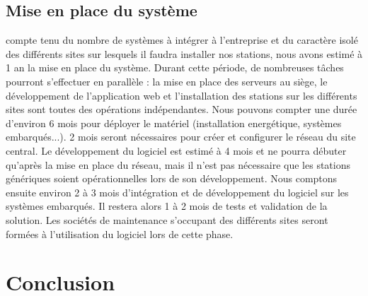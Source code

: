   \subsection{Mise en place du système}
  compte tenu du nombre de systèmes à intégrer à l'entreprise et du caractère isolé des différents sites sur lesquels il faudra installer nos stations, nous avons estimé à 1 an la mise en place du système. Durant cette période, de nombreuses tâches pourront s'effectuer en parallèle : la mise en place des serveurs au siège, le développement de l'application web et l'installation des stations sur les différents sites sont toutes des opérations indépendantes. Nous pouvons compter une durée d'environ 6 mois pour déployer le matériel (installation energétique, systèmes embarqués...). 2 mois seront nécessaires pour créer et configurer le réseau du site central. Le développement du logiciel est estimé à 4 mois et ne pourra débuter qu'après la mise en place du réseau, mais il n'est pas nécessaire que les stations génériques soient opérationnelles lors de son développement. Nous comptons ensuite environ 2 à 3 mois d'intégration et de développement du logiciel sur les systèmes embarqués. Il restera alors 1 à 2 mois de tests et validation de la solution. Les sociétés de maintenance s'occupant des différents sites seront formées à l'utilisation du logiciel lors de cette phase.

\section{Conclusion}  
